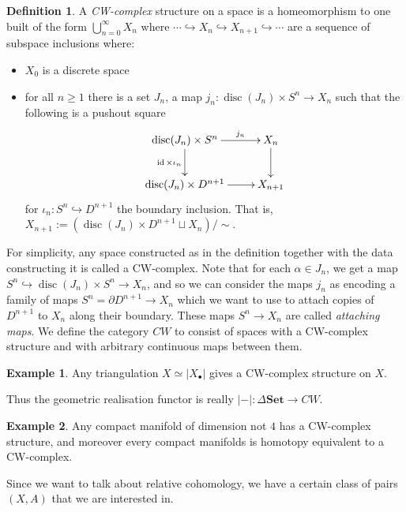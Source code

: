 \documentclass{tufte-handout}
\def\into {\hookrightarrow}
\def\Set {\mathbf{Set}}
\DeclareMathOperator{\disc}{disc}
\DeclareMathOperator{\id}{id}
\theoremstyle{definition}
\newtheorem{definition}{Definition}
\newtheorem{example}{Example}
\begin{document}
\begin{definition}
A \emph{CW-complex} structure on a space is a homeomorphism to one built of the form $\bigcup_{n=0}^\infty X_n$ 
where 
$\cdots \into X_n \into X_{n+1}\into \cdots$ are a sequence of subspace inclusions
where:
\begin{itemize}
\item $X_0$ is a discrete space
\item for all $n\geq 1$ there is a set $J_n$, a map $j_n\colon \disc(J_n)\times S^n \to X_n$ such that the 
following is a pushout square
\[
\xymatrix{
\disc(J_n) \times S^n \ar[r]^-{j_n} \ar[d]_{\id\times \iota_n} & X_n \ar[d]\\
\disc(J_n) \times D^{n+1} \ar[r] & X_{n+1}
}
\]
for $\iota_n\colon S^n \into D^{n+1}$ the boundary inclusion. That is, $X_{n+1} := (\disc(J_n)\times D^{n+1}\sqcup X_n)/\!\sim$.
\end{itemize}
\end{definition}

For simplicity, any space constructed as in the definition together with the data constructing 
it is called a CW-complex. Note that for each $\alpha\in J_n$, we get a map $S^n \into 
\disc(J_n) \times S^n \to X_n$, and so we can consider the maps $j_n$ as encoding a family of 
maps $S^n = \partial D^{n+1} \to X_n$ which we want to use to attach copies of $D^{n+1}$ to 
$X_n$ along their boundary. These maps $S^n \to X_n$ are called \emph{attaching maps}. We define 
the category $CW$ to consist of spaces with a CW-complex structure and with arbitrary continuous 
maps between them.


\begin{example}
Any triangulation $X \simeq |X_\bullet|$ gives a CW-complex structure on $X$.
\end{example}

Thus the geometric realisation functor is really $|-|\colon \Delta\Set \to CW$.

\begin{example}
Any compact manifold of dimension not $4$ has a CW-complex structure, and moreover every compact manifolds
is homotopy equivalent to a CW-complex.
\end{example}

Since we want to talk about relative cohomology, we have a certain class of pairs $(X,A)$ that we are interested in.
\end{document}
